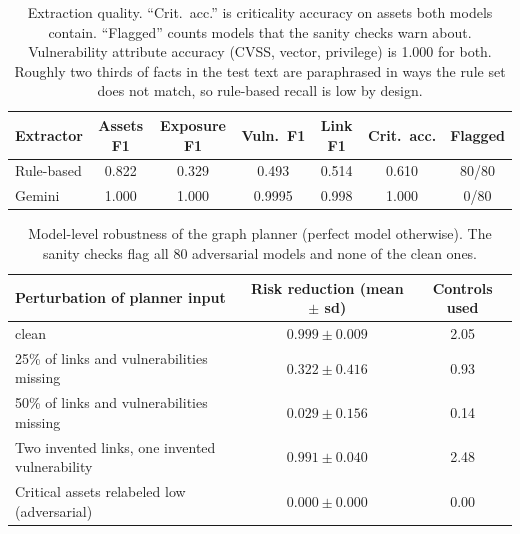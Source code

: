 \documentclass[11pt]{article}
\begin{document}
\begin{table}[h]
\centering
\begin{tabular}{lcccccc}
\toprule
Extractor & Assets F1 & Exposure F1 & Vuln.\ F1 & Link F1 & Crit.\ acc. & Flagged \\
\midrule
Rule-based & 0.822 & 0.329 & 0.493 & 0.514 & 0.610 & 80/80 \\
Gemini & 1.000 & 1.000 & 0.9995 & 0.998 & 1.000 & 0/80 \\
\bottomrule
\end{tabular}
\caption{Extraction quality. ``Crit.\ acc.'' is criticality accuracy on assets both models contain. ``Flagged'' counts models that the sanity checks warn about. Vulnerability attribute accuracy (CVSS, vector, privilege) is 1.000 for both. Roughly two thirds of facts in the test text are paraphrased in ways the rule set does not match, so rule-based recall is low by design.}
\label{tab:extract}
\end{table}

\begin{table}[h]
\centering
\begin{tabular}{lcc}
\toprule
Perturbation of planner input & Risk reduction (mean $\pm$ sd) & Controls used \\
\midrule
clean & $0.999 \pm 0.009$ & 2.05 \\
25\% of links and vulnerabilities missing & $0.322 \pm 0.416$ & 0.93 \\
50\% of links and vulnerabilities missing & $0.029 \pm 0.156$ & 0.14 \\
Two invented links, one invented vulnerability & $0.991 \pm 0.040$ & 2.48 \\
Critical assets relabeled low (adversarial) & $0.000 \pm 0.000$ & 0.00 \\
\bottomrule
\end{tabular}
\caption{Model-level robustness of the graph planner (perfect model otherwise). The sanity checks flag all 80 adversarial models and none of the clean ones.}
\label{tab:robust}
\end{table}
\end{document}
